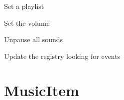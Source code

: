 \documentclass[letterpaper,10pt,english]{sphinxmanual}
\begin{document}
\begin{fulllineitems}
\begin{fulllineitems}
\end{fulllineitems}


\begin{fulllineitems}
\label{sound:serge.sound.MusicStore.setPlaylist}
Set a playlist

\end{fulllineitems}


\begin{fulllineitems}
\label{sound:serge.sound.MusicStore.setVolume}
Set the volume

\end{fulllineitems}


\begin{fulllineitems}
\label{sound:serge.sound.MusicStore.unpause}
Unpause all sounds

\end{fulllineitems}


\begin{fulllineitems}
\label{sound:serge.sound.MusicStore.update}
Update the registry looking for events

\end{fulllineitems}


\end{fulllineitems}



\section{MusicItem}
\label{sound:musicitem}
\end{document}
